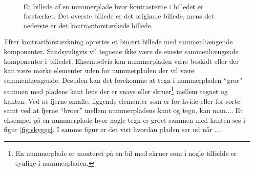 \begin{figure}[htp]
  \centering
  \begin{minipage}[c]{8 cm}
    \\
  \end{minipage}
  \caption{Et billede af en nummerplade hvor kontrasterne i billedet er forstærket. Det øverste billede er det originale billede, mens det nederste er det kontrastforstærkede billede.}
  \label{fig:kontrast}
\end{figure}

Efter kontrastforstærkning oprettes et binært billede med sammenhængende komponenter. Sandsynligvis vil tegnene ikke være de eneste sammenhængende komponenter i billedet. Eksempelvis kan nummerpladen være beskidt eller der kan være mørke elementer uden for nummerpladen der vil være sammenhængende. Desuden kan det forekomme at tegn i nummerpladen ``gror'' sammen med pladens kant hvis der er snavs eller skruer\footnote{En nummerplade er monteret på en bil med skruer som i nogle tilfælde er synlige i nummerpladen.} mellem tegnet og kanten. Ved at fjerne smalle, liggende elementer som er for hvide eller for sorte samt ved at fjerne ``broer'' mellem nummerpladens kant og tegn, kan man.... Et eksempel på en nummerplade hvor nogle tegn er groet sammen med kanten ses i figur \vref{fig:skygge}. I samme figur er det vist hvordan pladen ser ud når ....


